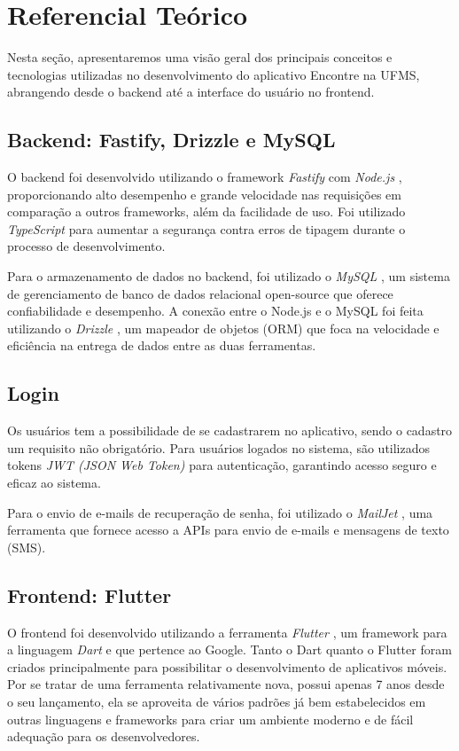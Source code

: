 \section{Referencial Teórico}
\label{sec:referencial_teorico}

Nesta seção, apresentaremos uma visão geral dos principais conceitos e tecnologias utilizadas no desenvolvimento do aplicativo Encontre na UFMS, abrangendo desde o backend até a interface do usuário no frontend.

\subsection{Backend: Fastify, Drizzle e MySQL}
O backend foi desenvolvido utilizando o framework \textit{Fastify} \cite{fastify} com \textit{Node.js} \cite{nodejs}, proporcionando alto desempenho e grande velocidade nas requisições em comparação a outros frameworks, além da facilidade de uso. Foi utilizado \textit{TypeScript} \cite{typescript} para aumentar a segurança contra erros de tipagem durante o processo de desenvolvimento.

Para o armazenamento de dados no backend, foi utilizado o \textit{MySQL} \cite{mysql}, um sistema de gerenciamento de banco de dados relacional open-source que oferece confiabilidade e desempenho. A conexão entre o Node.js e o MySQL foi feita utilizando o \textit{Drizzle} \cite{drizzle}, um mapeador de objetos (ORM) que foca na velocidade e eficiência na entrega de dados entre as duas ferramentas.

\subsection{Login}
Os usuários tem a possibilidade de se cadastrarem no aplicativo, sendo o cadastro um requisito não obrigatório. Para usuários logados no sistema, são utilizados tokens \textit{JWT (JSON Web Token)} \cite{jwt} para autenticação, garantindo acesso seguro e eficaz ao sistema.

Para o envio de e-mails de recuperação de senha, foi utilizado o \textit{MailJet} \cite{mailjet}, uma ferramenta que fornece acesso a APIs para envio de e-mails e mensagens de texto (SMS).

\subsection{Frontend: Flutter}
O frontend foi desenvolvido utilizando a ferramenta \textit{Flutter} \cite{flutter}, um framework para a linguagem \textit{Dart} \cite{dart} e que pertence ao Google. Tanto o Dart quanto o Flutter foram criados principalmente para possibilitar o desenvolvimento de aplicativos móveis. Por se tratar de uma ferramenta relativamente nova, possui apenas 7 anos desde o seu lançamento, ela se aproveita de vários padrões já bem estabelecidos em outras linguagens e frameworks para criar um ambiente moderno e de fácil adequação para os desenvolvedores.

